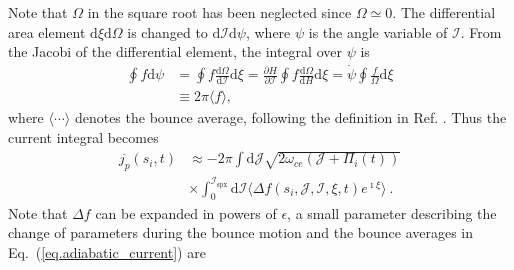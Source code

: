Note that $\Omega$ in the square root has been  neglected since $\Omega \simeq 0$.
The differential area element $\mathrm{d}\xi\mathrm{d}\Omega$ is changed to $\mathrm{d}\mathcal{I}\mathrm{d}\psi$, where $\psi$ is the angle variable of $\mathcal{I}$.
From the Jacobi of the differential element, the integral over $\psi$ is
\begin{equation}
    \begin{aligned}
      \oint f \mathrm{d}\psi & = \oint f \frac{\mathrm{d}\Omega}{\mathrm{d}\mathcal{I}}\mathrm{d}\xi = \frac{\partial H}{\partial \mathcal{I}} \oint f \frac{\mathrm{d}\Omega}{\mathrm{d} H}\mathrm{d}\xi = \dot{\psi}\oint \frac{f}{\Omega} \mathrm{d}\xi
      \\
      &\equiv 2 \pi \langle f \rangle,
    \end{aligned}
\end{equation}
where $\langle\cdots\rangle$ denotes the bounce average, following the definition in Ref. \cite{berk1999}.
Thus the current integral becomes
\begin{equation}\label{eq.adiabatic_current}
\begin{aligned}
    j_p(s_i,t)  &\approx -  {2\pi} \int\mathrm{d} \mathcal{J}  \sqrt{2\omega_{ce} (\mathcal{J} + \Pi_i(t))} \\
    & \times 
    \int_0^{\mathcal{I}_{\mathrm{s p x}}}\mathrm{d}\mathcal{I}  \langle \Delta f(s_i,\mathcal{J},\mathcal{I},\xi,t)e^{\imath \xi} \rangle  ~.
\end{aligned}
\end{equation}
Note that $\Delta f$ can be expanded in powers of $\epsilon$, a small parameter describing the change of parameters during the bounce motion
and the bounce averages in Eq.~(\ref{eq.adiabatic_current}) are 
